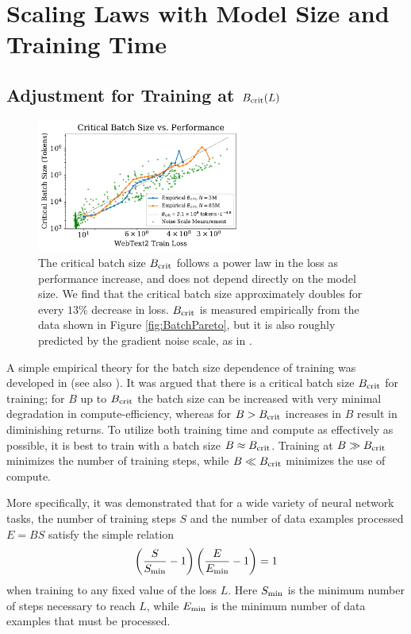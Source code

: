 \documentclass[english]{article}
\newcommand{\be}{\begin{equation}}
\newcommand{\ee}{\end{equation}}
\begin{document}
\section{Scaling Laws with Model Size and Training Time}
\label{sec:ScalingSizeandSteps}

\subsection{Adjustment for Training at $B_{\rm crit}(L)$}
\label{sec:OptimalBatchSize}

\begin{figure}
\noindent \centering{} 
\includegraphics[width=0.60\textwidth]{CriticalBatchSizeVsPerf}
\caption[Critical batch size]{The critical batch size $B_{\rm crit}$ follows a power law in the loss as performance increase, and does not depend directly on the model size.  We find that the critical batch size approximately doubles for every $13\%$ decrease in loss.  $B_{\rm crit}$  is measured empirically from the data shown in Figure \ref{fig:BatchPareto}, but it is also roughly predicted by the gradient noise scale, as in \cite{1812.06162}.  \label{fig:OptimalBatchSize}}
\end{figure}

A simple empirical theory for the batch size dependence of training was developed in \cite{1812.06162} (see also \cite{1811.03600, DBLP:journals/corr/abs-1907-04164}).  It was argued that there is a critical batch size $B_{\rm crit}$ for training; for $B$ up to $B_{\rm crit}$  the batch size can be increased with very minimal degradation in compute-efficiency, whereas for $B > B_{\rm crit}$ increases in $B$ result in diminishing returns.  To utilize both training time and compute as effectively as possible, it is best to train with a batch size $B \approx B_{\rm crit}$.  Training at $B \gg B_{\rm crit}$  minimizes the number of training steps, while $B \ll B_{\rm crit}$ minimizes the use of compute.

More specifically, it was demonstrated that for a wide variety of neural network tasks, the number of training steps $S$ and the number of data examples processed $E = B S$ satisfy the simple relation
\be
\label{eq:TimeComputeTradeoff}
\left( \frac{S}{S_{\rm min}} -1 \right) \left( \frac{E}{E_{\rm min}} - 1 \right) = 1
\ee
when training to any fixed value of the loss $L$.  Here $S_{\rm min}$ is the minimum number of steps necessary to reach $L$, while $E_{\rm min}$ is the minimum number of data examples that must be processed. 
\end{document}
